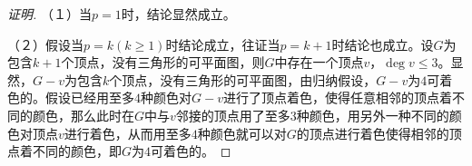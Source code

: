 \documentclass{article}
\begin{document}
\begin{CJK}{UTF8}{gbsn}
\begin{proof}[证明]
    （１）当$p=1$时，结论显然成立。

    （２）假设当$p=k(k\geq 1)$时结论成立，往证当$p=k+1$时结论也成立。设$G$为包含$k+1$个顶点，没有三角形的可平面图，则$G$中存在一个顶点$v$，$\deg v \leq 3$。显然，$G-v$为包含$k$个顶点，没有三角形的可平面图，由归纳假设，$G-v$为$4$可着色的。假设已经用至多$4$种颜色对$G-v$进行了顶点着色，使得任意相邻的顶点着不同的颜色，那么此时在$G$中与$v$邻接的顶点用了至多$3$种颜色，用另外一种不同的颜色对顶点$v$进行着色，从而用至多$4$种颜色就可以对$G$的顶点进行着色使得相邻的顶点着不同的颜色，即$G$为$4$可着色的。
    
  \end{proof}

\end{CJK}
\end{document}
